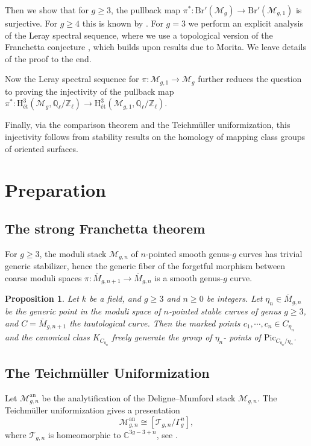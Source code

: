 \documentclass[12pt]{amsart}
\newtheorem{proposition}{Proposition}
\begin{document}
Then we show that for $g\geq3$, the pullback map $\pi^*\colon\mathrm{Br}'(\mathcal{M}_g)\to\mathrm{Br}'(\mathcal{M}_{g,1})$ is surjective. For $g\geq4$ this is known by \cite[Theorem 4.1]{zbMATH08105076}. For $g=3$ we perform an explicit analysis of the Leray spectral sequence, where we use a topological version of the Franchetta conjecture \cite[Theorem 24]{zbMATH01590471}, which builds upon results due to Morita. We leave details of the proof to the end.

Now the Leray spectral sequence for $\pi\colon\mathcal{M}_{g,1}\to\mathcal{M}_g$ further reduces the question to proving the injectivity of the pullback map $\pi^*\colon\mathrm{H}^3_{\textrm{\'et}}(\mathcal{M}_g,\mathbb{Q}_\ell/\mathbb{Z}_\ell)\to \mathrm{H}^3_{\textrm{\'et}}(\mathcal{M}_{g,1},\mathbb{Q}_\ell/\mathbb{Z}_\ell).$ 

Finally, via the comparison theorem and the Teichm\"uller uniformization, this injectivity follows from stability results \cite[Theorem 1.2]{zbMATH06492666} on the homology of mapping class groups of oriented surfaces.


\section{Preparation}
\subsection{The strong Franchetta theorem}For $g\geq3$, the moduli stack $\mathcal{M}_{g,n}$ of $n$-pointed smooth genus-$g$ curves has trivial generic stabilizer, hence the generic fiber of the forgetful morphism between coarse moduli spaces $\pi\colon \overline{M}_{g,n+1}\to\overline{M}_{g,n}$ is a smooth genus-$g$ curve.
\begin{proposition}{\cite[Theorem 5.1]{zbMATH02078578}}\label{strong-franchetta}
Let $k$ be a field, and $g\geq3$ and $n\geq0$ be integers. Let $\eta_n\in\overline{M}_{g,n}$ be the generic point in the moduli space of $n$-pointed stable curves of genus $g\geq3$, and $C=\overline{M}_{g,n+1}$ the tautological curve. Then the marked points $c_1,\cdots,c_n\in C_{\eta_n}$ and the canonical class $K_{C_{\eta_n}}$ freely generate the group of $\eta_n$- points of $\mathrm{Pic}_{C_{\eta_n}/\eta_n}$.
\end{proposition}

\subsection{The Teichm\"uller Uniformization}\label{Teich}
Let $\mathcal{M}_{g,n}^{\mathrm{an}}$ be the analytification of the Deligne--Mumford stack $\mathcal{M}_{g,n}$. The Teichm\"uller uniformization gives a presentation $$\mathcal{M}^{\mathrm{an}}_{g,n}\cong[\mathcal{T}_{g,n}/\Gamma_g^n],$$
where $\mathcal{T}_{g,n}$ is homeomorphic to $\mathbb{C}^{3g-3+n}$, see \cite[Chapter XV]{zbMATH05798333}.
\end{document}
